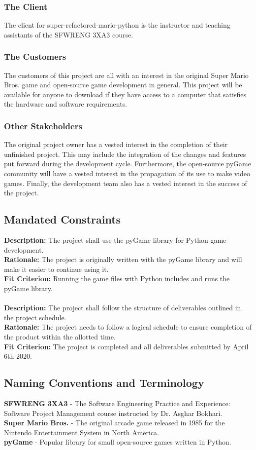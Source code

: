 \documentclass[12pt, titlepage]{article}
\begin{document}
\subsubsection{The Client}
    The client for super-refactored-mario-python is the instructor and teaching assistants of the SFWRENG 3XA3 course.
\subsubsection{The Customers}
    The customers of this project are all with an interest in the original Super Mario Bros. game and open-source game development in general. This project will be available for anyone to download if they have access to a computer that satisfies the hardware and software requirements.
\subsubsection{Other Stakeholders}
    The original project owner has a vested interest in the completion of their unfinished project. This may include the integration of the changes and features put forward during the development cycle. Furthermore, the open-source pyGame community will have a vested interest in the propagation of its use to make video games. Finally, the development team also has a vested interest in the success of the project.
\subsection{Mandated Constraints}
    \textbf{Description:} The project shall use the pyGame library for Python game development.\\
    \textbf{Rationale:} The project is originally written with the pyGame library and will make it easier to continue using it.\\
    \textbf{Fit Criterion:} Running the game files with Python includes and runs the pyGame library.\\\\
    \textbf{Description:} The project shall follow the structure of deliverables outlined in the project schedule.\\
    \textbf{Rationale:} The project needs to follow a logical schedule to ensure completion of the product within the allotted time.\\
    \textbf{Fit Criterion:} The project is completed and all deliverables submitted by April 6th 2020.
\subsection{Naming Conventions and Terminology}
    \textbf{SFWRENG 3XA3} - The Software Engineering Practice and Experience: Software Project Management course instructed by Dr. Asghar Bokhari.\\
    \textbf{Super Mario Bros.} - The original arcade game released in 1985 for the Nintendo Entertainment System in North America.\\
    \textbf{pyGame} - Popular library for small open-source games written in Python.\\
\end{document}
